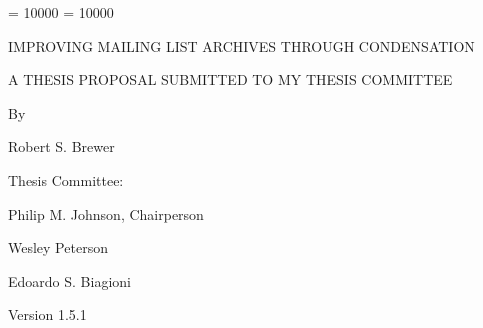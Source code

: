 
\clubpenalty = 10000    
\widowpenalty = 10000
\sloppy
\thispagestyle{empty}

\par\vspace*{0.00in}

\begin{center}
  IMPROVING MAILING LIST ARCHIVES
  THROUGH CONDENSATION\\ 

\end{center}

\vspace*{0.6in}

  \begin{center}  
  A THESIS PROPOSAL SUBMITTED TO MY THESIS COMMITTEE\\
  
\end{center}

\begin{center}

\vspace*{0.7in}
 
  By   
  
  \vspace{.2in}
  
  Robert S. Brewer

  \vspace{0.2in}
\end{center}  

\begin{center}
  Thesis Committee:
  \vspace{0.2in}

  Philip M. Johnson, Chairperson

  Wesley Peterson

  Edoardo S. Biagioni

\end{center}

\vspace*{1in}
\begin{center}
  Version 1.5.1
\end{center}
